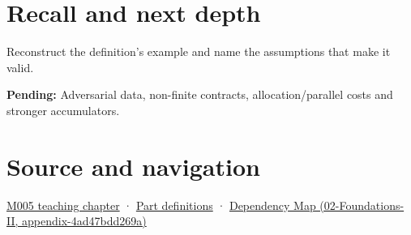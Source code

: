 \section{Recall and next depth}\label{appendix-df318da57389-recall-and-next-depth}

Reconstruct the definition's example and name the assumptions that make it valid.

\textbf{Pending:} Adversarial data, non-finite contracts, allocation/parallel costs and stronger accumulators.

\section{Source and navigation}\label{appendix-df318da57389-source-and-navigation}

\href{Continuous\%20Notes/Computing\%20Foundations\%20-\%20From\%20Bits\%20to\%20C++\%20and\%20Systems\%20APIs\#When\%20arithmetic\%20meets\%20uncertainty}{M005 teaching chapter} · \hyperref[appendix-fd090d982a15-m005---parts-77-88]{Part definitions} · \href{../02-Foundations-II/main.pdf\#nameddest=appendix-4ad47bdd269a}{Dependency Map (02-Foundations-II, appendix-4ad47bdd269a)}
